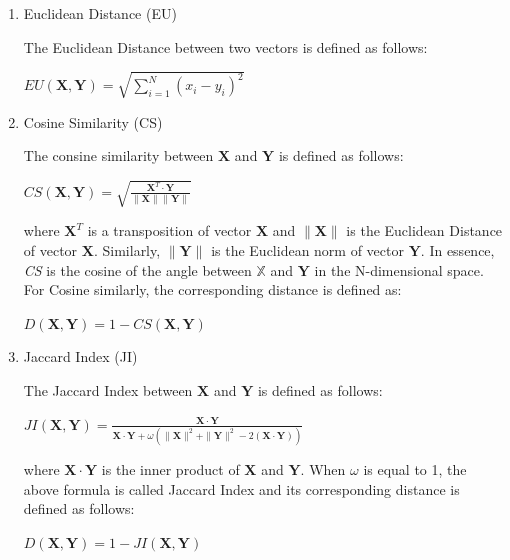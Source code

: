 \begin{enumerate}
\item Euclidean Distance (EU)

The Euclidean Distance between two vectors is defined as follows:
\begin{center}
$EU(\mathbf{X}, \mathbf{Y}) = \displaystyle \sqrt{\sum_{i=1}^{N} (x_i-y_i)^2}$
\end{center}


\item Cosine Similarity (CS)

The consine similarity between $\mathbf{X}$ and $\mathbf{Y}$ is defined as follows:

\begin{center}
$CS(\mathbf{X}, \mathbf{Y}) = \displaystyle \sqrt{\frac{\mathbf{X}^T \cdot \mathbf{Y}} {\| \mathbf{X} \|\| \mathbf{Y} \|}}$
\end{center}
where $\mathbf{X}^T$ is a transposition of vector $\mathbf{X}$ and $\| \mathbf{X}\|$ is the Euclidean Distance of
vector $\mathbf{X}$. Similarly, $\|\mathbf{Y}\|$ is the Euclidean norm of vector $\mathbf{Y}$. In essence, \textit{CS} is the cosine of the angle between $\mathbb{X}$ and $\mathbf{Y}$ in the N-dimensional space. For Cosine similarly, the corresponding distance is defined as:

\begin{center}
$D(\mathbf{X},\mathbf{Y}) = 1 - CS(\mathbf{X},\mathbf{Y})$
\end{center}

\item Jaccard Index (JI)

The Jaccard Index between $\mathbf{X}$ and $\mathbf{Y}$ is defined as follows:

\begin{center}
$JI(\mathbf{X}, \mathbf{Y}) = \displaystyle \frac{\mathbf{X} \cdot \mathbf{Y}}{\mathbf{X} \cdot \mathbf{Y}+\omega(\|\mathbf{X}\|^2+\|\mathbf{Y}\|^2-2(\mathbf{X} \cdot \mathbf{Y}))}$
\end{center}

where $\mathbf{X} \cdot \mathbf{Y}$ is the inner product of $\mathbf{X}$ and $\mathbf{Y}$. 
When $\omega$ is equal to 1, the above formula is called Jaccard Index and its corresponding distance is defined as follows:

\begin{center}
$D(\mathbf{X},\mathbf{Y}) = 1 - JI(\mathbf{X},\mathbf{Y})$
\end{center}

\end{enumerate}

